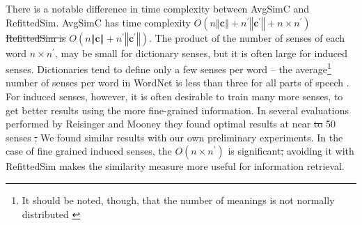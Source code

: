 \documentclass{sig-alternate}
\renewcommand{\c}{\mathbf{c}}
\providecommand{\DIFadd}[1]{{\protect\color{blue}\uwave{#1}}} %
\providecommand{\DIFdel}[1]{{\protect\color{red}\sout{#1}}}                      %
\providecommand{\DIFaddbegin}{} %
\providecommand{\DIFaddend}{} %
\providecommand{\DIFdelbegin}{} %
\providecommand{\DIFdelend}{} %
\begin{document}
There is a notable difference in time complexity between AvgSimC and RefittedSim.
AvgSimC has time complexity $O(n\left\Vert \c\right\Vert +n^{\prime}\left\Vert \c^{\prime}\right\Vert +n\times n^{\prime})$\DIFdelbegin \DIFdel{RefittedSim is }\DIFdelend \DIFaddbegin \DIFadd{,
while RefittedSim has }\DIFaddend $O(n\left\Vert \c\right\Vert +n^{\prime}\left\Vert \c^{\prime}\right\Vert)$.
The product of the number of senses of each word $n \times n^\prime$, may be small for dictionary senses, but it is often large for induced senses. Dictionaries tend to define only a few senses per word -- the average\footnote{It should be noted, though, that the number of meanings is not normally distributed \parencite{zipf1945meaning}\DIFaddbegin \DIFadd{.}\DIFaddend } number of senses per word in WordNet is less than three for all parts of speech \parencite{miller1995wordnet}. For induced senses, however, it is often desirable to train many more senses, to get better results using the more fine-grained information. In several evaluations performed by Reisinger and Mooney they found optimal results at near \DIFdelbegin \DIFdel{to }\DIFdelend 50 senses \parencite{Reisinger2010}\DIFdelbegin \DIFdel{; }\DIFdelend \DIFaddbegin \DIFadd{. }\DIFaddend We found similar results with our own preliminary experiments.
In the case of fine grained induced senses, the $O(n \times n^\prime)$ is significant\DIFdelbegin \DIFdel{; }\DIFdelend \DIFaddbegin \DIFadd{, }\DIFaddend avoiding it with RefittedSim makes the similarity measure more useful for information retrieval.
\end{document}
